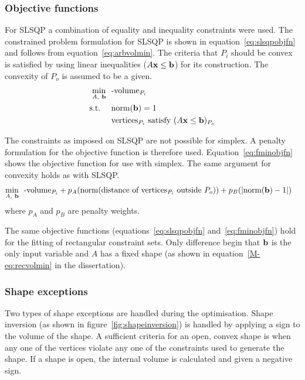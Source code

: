 \subsubsection{Objective functions}
For SLSQP a combination of equality and inequality constraints were used.
The constrained problem formulation for SLSQP is shown in equation~\ref{eq:slsqpobjfn} and follows from equation~\ref{eq:arbvolmin}.
The criteria that $P_i$ should be convex is satisfied by using linear inequalities ($A{\bf {x}} \leq {\bf {b}}$) for its construction.
The convexity of $P_o$ is assumed to be a given.
\begin{align}
  \label{eq:slsqpobjfn}
    \min_{A,~{\bf {b}}}~~&\text{-volume}_{P_i}\\
    \text{s.t.}~~~~ &\text{norm}({\bf {b}}) = 1 \notag \\
                    &\text{vertices}_{P_i} \text{~satisfy~} (A{\bf {x}}\leq{\bf {b}})_{P_o} \notag  
\end{align}

The constraints as imposed on SLSQP are not possible for simplex.
A penalty formulation for the objective function is therefore used.
Equation~\ref{eq:fminobjfn} shows the objective function for use with simplex.
The same argument for convexity holds as with SLSQP.
\begin{align}
  \label{eq:fminobjfn}
    \min_{A,~{\bf {b}}}~~&\text{-volume}_{P_i} + p_A(\text{norm}(\text{distance of vertices$_{P_i}$ outside}~P_o)) + p_B(|\text{norm}({\bf {b}}) - 1|)  
\end{align}
where $p_A$ and $p_B$ are penalty weights.

The same objective functions (equations~\ref{eq:slsqpobjfn} and~\ref{eq:fminobjfn}) hold for the fitting of rectangular constraint sets.
Only difference begin that ${\bf {b}}$ is the only input variable and $A$ has a fixed shape (as shown in equation~\ref{M-eq:recvolmin} in the dissertation).

\subsubsection{Shape exceptions}
Two types of shape exceptions are handled during the optimisation.
Shape inversion (as shown in figure~\ref{fig:shapeinversion}) is handled by applying a sign to the volume of the shape.
A sufficient criteria for an open, convex shape is when any one of the vertices violate any one of the constraints used to generate the shape.
If a shape is open, the internal volume is calculated and given a negative sign.

